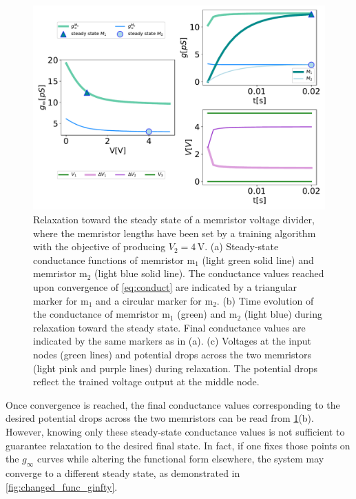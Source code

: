 \documentclass[reprint,superscriptaddress,prb,showkeys]{revtex4-2}
\newcommand{\m}{\text{m}} %
\begin{document}
\begin{figure}[t]
    \centering
    \includegraphics[width=\columnwidth]{plots/appendixA/grid_trained.pdf}
    \caption{Relaxation toward the steady state of a memristor voltage divider, where the memristor lengths have been set by a training algorithm with the objective of producing $V_2 = 4\,\mathrm{V}$. (a) Steady-state conductance functions of memristor $\m_1$ (light green solid line) and memristor $\m_2$ (light blue solid line). The conductance values reached upon convergence of \cref{eq:conduct} are indicated by a triangular marker for $\m_1$ and a circular marker for $\m_2$. (b) Time evolution of the conductance of memristor $\m_1$ (green) and $\m_2$ (light blue) during relaxation toward the steady state. Final conductance values are indicated by the same markers as in (a). (c) Voltages at the input nodes (green lines) and potential drops across the two memristors (light pink and purple lines) during relaxation. The potential drops reflect the trained voltage output at the middle node.
    }
    \label{fig:trained_memr}
\end{figure} 

Once convergence is reached, the final conductance values corresponding to the desired potential drops across the two memristors can be read from \cref{fig:trained_memr}(b). However, knowing only these steady-state conductance values is not sufficient to guarantee relaxation to the desired final state. In fact, if one fixes those points on the $g_{\infty}$ curves while altering the functional form elsewhere, the system may converge to a different steady state, as demonstrated in \cref{fig:changed_func_ginfty}. 
\end{document}
